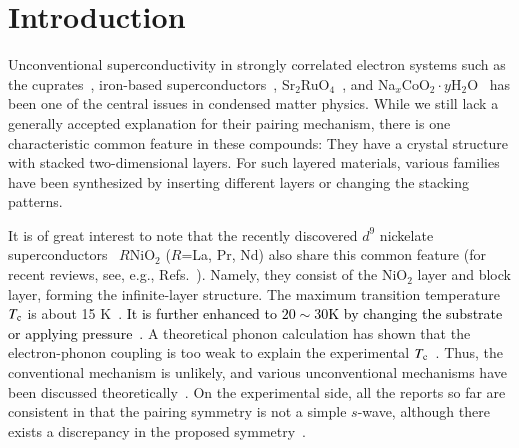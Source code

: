 \documentclass[%
 aip,
 amsmath,amssymb,
 reprint,%
]{revtex4-1}
\newcommand{\mk}[1]{{\textcolor{black}{#1}}}
\begin{document}
\maketitle

\section{Introduction}
Unconventional superconductivity in strongly correlated electron systems such as the cuprates~\cite{Bednorz_1986}, iron-based superconductors~\cite{Kamihara_2008},
Sr$_2$RuO$_4$~\cite{Maeno_1994}, and Na$_x$CoO$_2\cdot y$H$_2$O~\cite{Takada_2003} has been one of the central issues in condensed matter physics. While we still lack a generally accepted explanation for their pairing mechanism, there is one characteristic common feature in these compounds: They have a crystal structure with stacked two-dimensional layers. For such layered materials, various families have been synthesized by inserting different layers or changing the stacking patterns. 

It is of great interest to note that the recently discovered $d^9$ nickelate superconductors~\cite{Li_2019,D_Li_2020,Osada_2020,Osada_2020_2,Osada_2021,SW_Zeng_2020,SW_Zeng_2022} $R$NiO$_2$ ($R$=La, Pr, Nd) also share this common feature (for recent reviews, see, e.g.,  Refs.~). Namely, they consist of the NiO$_2$ layer and block layer, forming the infinite-layer structure.  
The maximum transition temperature $T_{\rm c}$ is about 15 K~\cite{Li_2019,D_Li_2020,Osada_2020,Osada_2020_2,Osada_2021,SW_Zeng_2020,SW_Zeng_2022}. 
\mk{It is further enhanced to $20\sim30$K by changing the substrate or applying pressure~\cite{Ren_2021,NN_Wang_2021,Lee_2022}.}
A theoretical phonon calculation has shown that the electron-phonon coupling is too weak to explain the experimental $T_{\rm c}$~\cite{Nomura_2019}.
Thus, the conventional mechanism is unlikely, and various unconventional mechanisms have been discussed theoretically~\cite{Sakakibara_2020,Hirsch_2019,Wu_2020,Werner_2020,YH_Zhang_2020,J_Chang_2020,Kitatani_2020,Adhikary_2020,Z_Wang_2020,C_Lu_2022,TY_Xie_arXiv,Karp_arXiv,M_Jiang_arXiv,Kreisel_arXiv}. 
On the experimental side, all the reports so far are consistent in that the pairing symmetry is not a simple $s$-wave, although there exists a discrepancy in the proposed symmetry~\cite{Q_Gu_2020,Chow_arXiv_2,Harvey_arXiv}.
\end{document}
